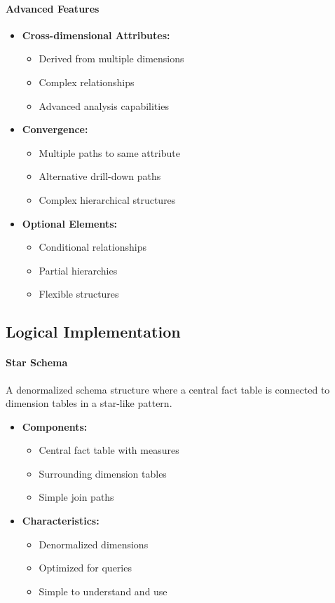 \documentclass[a4paper,11pt]{article}
\newcommand{\definition}[1]{
  \begin{tcolorbox}[colback=blue!5,colframe=blue!40!black,title=Definition]
    #1
  \end{tcolorbox}
}
\begin{document}
\paragraph{Advanced Features}
\begin{itemize}
    \item \textbf{Cross-dimensional Attributes:}
        \begin{itemize}
            \item Derived from multiple dimensions
            \item Complex relationships
            \item Advanced analysis capabilities
        \end{itemize}
    \item \textbf{Convergence:}
        \begin{itemize}
            \item Multiple paths to same attribute
            \item Alternative drill-down paths
            \item Complex hierarchical structures
        \end{itemize}
    \item \textbf{Optional Elements:}
        \begin{itemize}
            \item Conditional relationships
            \item Partial hierarchies
            \item Flexible structures
        \end{itemize}
\end{itemize}

\subsection{Logical Implementation}

\paragraph{Star Schema}
\definition{
A denormalized schema structure where a central fact table is connected to dimension tables in a star-like pattern.
}

\begin{itemize}
    \item \textbf{Components:}
        \begin{itemize}
            \item Central fact table with measures
            \item Surrounding dimension tables
            \item Simple join paths
        \end{itemize}
    \item \textbf{Characteristics:}
        \begin{itemize}
            \item Denormalized dimensions
            \item Optimized for queries
            \item Simple to understand and use
        \end{itemize}
\end{itemize}
\end{document}
